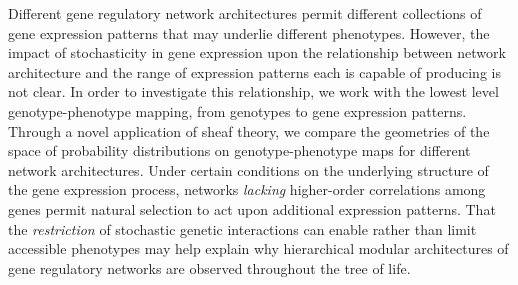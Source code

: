 Different gene regulatory network architectures permit different collections of gene expression patterns that may underlie different phenotypes. However, the impact of stochasticity in gene expression upon the relationship between network architecture and the range of expression patterns each is capable of producing is not clear. In order to investigate this relationship, we work with the lowest level genotype-phenotype mapping, from genotypes to gene expression patterns. Through a novel application of sheaf theory, we compare the geometries of the space of probability distributions on genotype-phenotype maps for different network architectures. Under certain conditions on the underlying structure of the gene expression process, networks \emph{lacking} higher-order correlations among genes permit natural selection to act upon additional expression patterns. That the \emph{restriction} of stochastic genetic interactions can enable rather than limit accessible phenotypes may help explain why hierarchical modular architectures of gene regulatory networks are observed throughout the tree of life.

